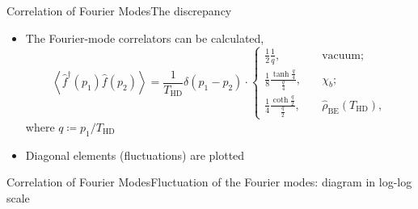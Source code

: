 \documentclass{beamer}
\newcommand{\rbr}[1]{{\left(#1\right)}}
\newcommand{\abr}[1]{{\left<#1\right>}}
\newcommand{\rfun}[2]{{#1}\mathopen{}\left(#2\right)\mathclose{}}
\newcommand{\what}[1]{{\widehat{#1}}}
\begin{document}



\begin{frame}{Correlation of Fourier Modes}{The discrepancy}

\begin{itemize}
\item The Fourier-mode correlators can be calculated,
\begin{equation}
\abr{\rfun{\what{f}^\dagger}{p_1}\rfun{\what{f}}{p_2}} =
\frac{1}{T_\text{HD}} \rfun{\delta}{p_1 - p_2} \cdot
\begin{cases}
\frac{1}{2} \frac{1}{q},
&\quad \text{vacuum};\\
\frac{1}{8}\frac{\tanh\frac{q}{4}}{\frac{q}{4}},
&\quad \chi_b; \\
\frac{1}{4} \frac{\coth\frac{q}{2}}{\frac{q}{2}},
&\quad \rfun{\what{\rho}_\text{BE}}{T_\text{HD}},
\end{cases}
\end{equation}
where $q \coloneqq p_1/T_\text{HD}$
\item Diagonal elements (fluctuations) are plotted
\end{itemize}

\end{frame}

\begin{frame}{Correlation of Fourier Modes}{Fluctuation of the Fourier 
modes: diagram in log-log scale}

%

\end{frame}
\end{document}
